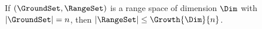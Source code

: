 \begin {lemma} If $(\GroundSet ,\RangeSet )$ is a range space of \VC dimension $\Dim $ with $|\GroundSet | = n$, then $|\RangeSet | \leq \Growth {\Dim }{n}$. \end {lemma}
